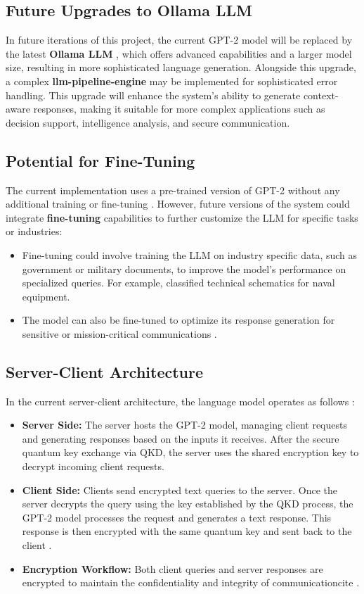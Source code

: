 \documentclass{article}
\begin{document}
\subsection{Future Upgrades to Ollama LLM}
In future iterations of this project, the current GPT-2 model will be replaced by the latest \textbf{Ollama LLM} \cite{huggingface_llm_2024}, which offers advanced capabilities and a larger model size, resulting in more sophisticated language generation. Alongside this upgrade, a complex \textbf{llm-pipeline-engine} may be implemented for sophisticated error handling. This upgrade will enhance the system’s ability to generate context-aware responses, making it suitable for more complex applications such as decision support, intelligence analysis, and secure communication.

\subsection{Potential for Fine-Tuning}
The current implementation uses a pre-trained version of GPT-2 without any additional training or fine-tuning \cite{jalammar_gpt2_illustration_2024}. However, future versions of the system could integrate \textbf{fine-tuning} capabilities to further customize the LLM for specific tasks or industries:
\begin{itemize}
    \item Fine-tuning could involve training the LLM on industry specific data, such as government or military documents, to improve the model's performance on specialized queries. For example, classified technical schematics for naval equipment. 
    \item The model can also be fine-tuned to optimize its response generation for sensitive or mission-critical communications \cite{huggingface_llm_2024}.
\end{itemize}

\subsection{Server-Client Architecture}
In the current server-client architecture, the language model operates as follows \cite{mlabonne_llm_course_2024}:
\begin{itemize}
    \item \textbf{Server Side:} The server hosts the GPT-2 model, managing client requests and generating responses based on the inputs it receives. After the secure quantum key exchange via QKD, the server uses the shared encryption key to decrypt incoming client requests.
    \item \textbf{Client Side:} Clients send encrypted text queries to the server. Once the server decrypts the query using the key established by the QKD process, the GPT-2 model processes the request and generates a text response. This response is then encrypted with the same quantum key and sent back to the client \cite{huggingface_gpt2_2024}.
    \item \textbf{Encryption Workflow:} Both client queries and server responses are encrypted to maintain the confidentiality and integrity of communicationcite \cite{semaphoreci_llms_2024}.
\end{itemize}
\end{document}
